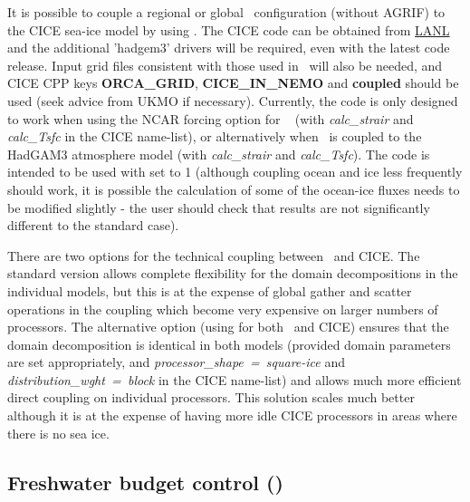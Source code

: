 \documentclass[../main/NEMO_manual]{subfiles}
\begin{document}
It is possible to couple a regional or global \NEMO\ configuration (without AGRIF)
to the CICE sea-ice model by using .
The CICE code can be obtained from \href{http://oceans11.lanl.gov/trac/CICE/}{LANL} and
the additional 'hadgem3' drivers will be required, even with the latest code release.
Input grid files consistent with those used in \NEMO\ will also be needed,
and CICE CPP keys \textbf{ORCA\_GRID}, \textbf{CICE\_IN\_NEMO} and \textbf{coupled} should be used
(seek advice from UKMO if necessary).
Currently, the code is only designed to work when using the NCAR forcing option for \NEMO\ %
(with \textit{calc\_strair} and \textit{calc\_Tsfc} in the CICE name-list),
or alternatively when \NEMO\ is coupled to the HadGAM3 atmosphere model
(with \textit{calc\_strair} and \textit{calc\_Tsfc}).
The code is intended to be used with  set to 1
(although coupling ocean and ice less frequently should work,
it is possible the calculation of some of the ocean-ice fluxes needs to be modified slightly -
the user should check that results are not significantly different to the standard case).

There are two options for the technical coupling between \NEMO\ and CICE.
The standard version allows complete flexibility for the domain decompositions in the individual models,
but this is at the expense of global gather and scatter operations in the coupling which
become very expensive on larger numbers of processors.
The alternative option (using  for both \NEMO\ and CICE) ensures that
the domain decomposition is identical in both models (provided domain parameters are set appropriately,
and \textit{processor\_shape~=~square-ice} and \textit{distribution\_wght~=~block} in the CICE name-list) and
allows much more efficient direct coupling on individual processors.
This solution scales much better although it is at the expense of having more idle CICE processors in areas where
there is no sea ice.

\subsection[Freshwater budget control (\textit{sbcfwb.F90})]{Freshwater budget control (\protect{})}
\label{subsec:SBC_fwb}

\begin{listing}
  \caption{}
  \label{lst:namsbc_fwb}
\end{listing}
\end{document}
